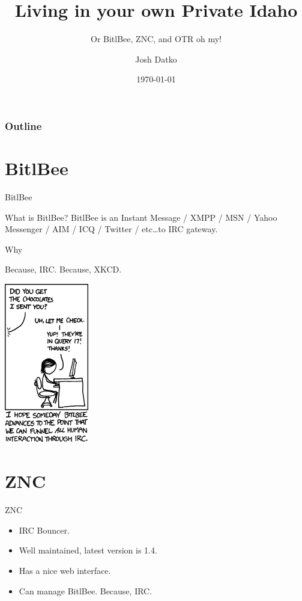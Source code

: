 \documentclass{beamer} \usetheme{Boadilla}
\title{Living in your own Private Idaho}
\subtitle{Or BitlBee, ZNC, and OTR oh my!}
\author{Josh Datko}
\institute[NCLug] { NCLug }
\date{\today}
\begin{document}
\maketitle

\begin{frame}
\frametitle{Outline}
\tableofcontents
\end{frame}

\section{BitlBee}

\begin{frame}{BitlBee}


\begin{bclogo}[couleur = blue!30,arrondi = 0.1, logo = \bcbombe,
   ombre = true]{What is BitlBee?}
   BitlBee is an Instant Message / XMPP / MSN / Yahoo Messenger / AIM
   / ICQ / Twitter / etc\ldots to IRC gateway.
 \end{bclogo}

\end{frame}

\begin{frame}{Why}

Because, IRC.
Because, XKCD.

    \begin{center}
      \includegraphics[height=7cm]{bitlbee_xkcd.png}
    \end{center}

\end{frame}

\section{ZNC}

\begin{frame}{ZNC}

  \begin{itemize}
  \item IRC Bouncer. \bigskip
  \item Well maintained, latest version is 1.4. \bigskip
    \item Has a nice web interface. \bigskip
\item Can manage BitlBee. Because, IRC.
  \end{itemize}
\end{frame}
\end{document}
